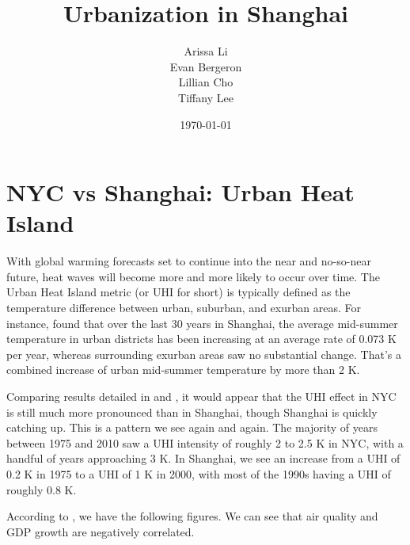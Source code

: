 \documentclass[11pt]{article}
\title{Urbanization in Shanghai}
\author{%
Arissa Li\\
Evan Bergeron\\
Lillian Cho\\
Tiffany Lee
}
\date{\today}
\begin{document}
\maketitle
\section{NYC vs Shanghai: Urban Heat Island}

With global warming forecasts set to continue into the near and
no-so-near future, heat waves will become more and more likely to
occur over time. The Urban Heat Island metric (or UHI for short) is
typically defined as the temperature difference between urban,
suburban, and exurban areas. For instance, \cite{Tan2010} found that
over the last 30 years in Shanghai, the average mid-summer temperature
in urban districts has been increasing at an average rate of 0.073 K
per year, whereas surrounding exurban areas saw no substantial
change. That's a combined increase of urban mid-summer temperature by
more than 2 K.

Comparing results detailed in \cite{Gaffin2008} and \cite{Tan2010}, it
would appear that the UHI effect in NYC is still much more pronounced
than in Shanghai, though Shanghai is quickly catching up. This is a
pattern we see again and again. The majority of years between 1975 and
2010 saw a UHI intensity of roughly 2 to 2.5 K in NYC, with a handful
of years approaching 3 K. In Shanghai, we see an increase from a UHI
of 0.2 K in 1975 to a UHI of 1 K in 2000, with most of the 1990s
having a UHI of roughly 0.8 K.

According to \cite{Xia2014}, we have the following figures. We can see
that air quality and GDP growth are negatively correlated.
\end{document}
